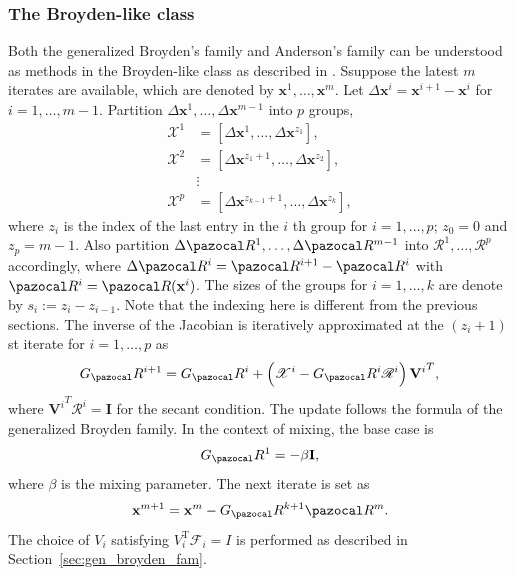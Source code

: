 \subsubsection{The Broyden-like class}

Both the generalized Broyden's family and Anderson's family can be understood as methods in the Broyden-like class as described in \cite{fang_two_2009}.
Ssuppose the latest \(m\) iterates are available, which are denoted by \(\mathbf x^{1}, \ldots, \mathbf x^{m}\).
Let \(\Delta \mathbf x^{i}=\mathbf x^{i+1}- \mathbf x^{i}\) for \(i=1, \ldots, m-1\).
Partition \(\Delta \mathbf x^{1}, \ldots, \Delta \mathbf x^{m-1}\) into \(p\) groups,
\begin{align}
\mathscr{X}^{1} & =\left[\Delta \mathbf x^{1}, \ldots, \Delta \mathbf x^{z_{1}}\right], \\
\mathscr{X}^{2} & =\left[\Delta \mathbf x^{z_{1}+1}, \ldots, \Delta \mathbf x^{z_{2}}\right],\\
& \vdots \\
\mathscr{X}^{p} & =\left[\Delta \mathbf x^{z_{k-1}+1}, \ldots, \Delta \mathbf x^{z_{k}}\right],
\end{align}
where \(z_{i}\) is the index of the last entry in the \(i\) th group for \(i=1, \ldots, p\); \(z_{0}=0\) and \(z_{p}=m-1\).
Also partition \(\Delta \pazocal R^{1}, \ldots, \Delta \pazocal R^{m-1}\) into \(\mathscr R^{1}, \ldots, \mathscr R^p\) accordingly, where \(\Delta \pazocal R^{i}=\pazocal R^{i+1}- \pazocal R^{i}\) with \(\pazocal R^{i}=\pazocal R(\mathbf x^{i})\).  The sizes of the groups for \(i=1, \ldots, k\) are denote by \(s_{i}:=z_{i}-z_{i-1}\).
Note that the indexing here is different from the previous sections.
The inverse of the Jacobian is iteratively approximated at the \(\left(z_{i}+1\right)\)st iterate for \(i=1, \ldots, p\) as
\begin{equation} \label{sec:broyden_like_class_g_update}
  G_\pazocal R^{i+1} = G_\pazocal R^{i}+\left(\mathscr{X}^{i}-G_\pazocal R^{i} \mathscr R^{i}\right) {\mathbf V^{i}}^T,
\end{equation}
where \({\mathbf V^{i}}^T \mathscr{R}^{i}=\mathbf I\) for the secant condition.
The update follows the formula of the generalized Broyden family.
In the context of mixing, the base case is
\begin{equation}
  G_\pazocal R^{1}=-\beta \mathbf I,
\end{equation}
where \(\beta\) is the mixing parameter.
The next iterate is set as
\begin{equation} \label{eq:update_broyden_family}
  \mathbf x^{m+1}=\mathbf x^{m}-G_\pazocal R^{k+1} \pazocal R^m.
\end{equation}
The choice of \(V_{i}\) satisfying \(V_{i}^{\mathrm{T}} \mathscr{F}_{i}=I\) is performed as described in Section~\ref{sec:gen_broyden_fam}.


